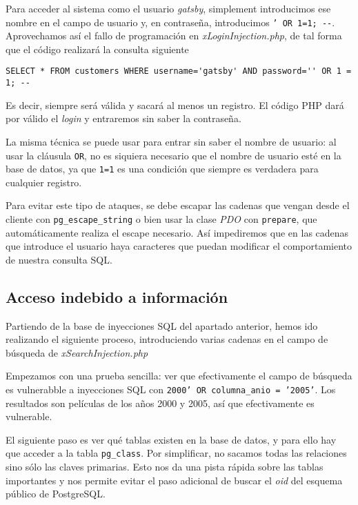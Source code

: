 \documentclass{article}
\begin{document}
Para acceder al sistema como el usuario \textit{gatsby}, simplement introducimos ese nombre en el campo de usuario y, en contraseña, introducimos \texttt{' OR 1=1; {-}-}. Aprovechamos así el fallo de programación en \textit{xLoginInjection.php}, de tal forma que el código realizará la consulta siguiente

\begin{Verbatim}[frame = lines]
SELECT * FROM customers WHERE username='gatsby' AND password='' OR 1 = 1; --
\end{Verbatim}

Es decir, siempre será válida y sacará al menos un registro. El código PHP dará por válido el \textit{login} y entraremos sin saber la contraseña.

La misma técnica se puede usar para entrar sin saber el nombre de usuario: al usar la cláusula \texttt{OR}, no es siquiera necesario que el nombre de usuario esté en la base de datos, ya que \texttt{1=1} es una condición que siempre es verdadera para cualquier registro.

Para evitar este tipo de ataques, se debe escapar las cadenas que vengan desde el cliente con \texttt{pg\_escape\_string} o bien usar la clase \textit{PDO} con \texttt{prepare}, que automáticamente realiza el escape necesario. Así impediremos que en las cadenas que introduce el usuario haya caracteres que puedan modificar el comportamiento de nuestra consulta SQL.

\subsection{Acceso indebido a información}

Partiendo de la base de inyecciones SQL del apartado anterior, hemos ido realizando el siguiente proceso, introduciendo varias cadenas en el campo de búsqueda de \textit{xSearchInjection.php}

Empezamos con una prueba sencilla: ver que efectivamente el campo de búsqueda es vulnerabble a inyecciones SQL con \texttt{2000' OR columna\_anio = '2005'}. Los resultados son películas de los años 2000 y 2005, así que efectivamente es vulnerable.

El siguiente paso es ver qué tablas existen en la base de datos, y para ello hay que acceder a la tabla \texttt{pg\_class}. Por simplificar, no sacamos todas las relaciones sino sólo las claves primarias. Esto nos da una pista rápida sobre las tablas importantes y nos permite evitar el paso adicional de buscar el \textit{oid} del esquema público de PostgreSQL.
\end{document}
